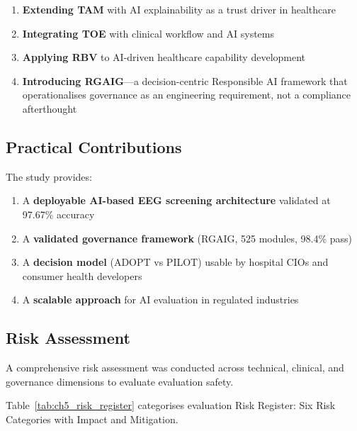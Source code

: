 \begin{enumerate}[label=(\alph*)]
    \item \textbf{Extending TAM} with AI explainability as a trust driver in healthcare
    \item \textbf{Integrating TOE} with clinical workflow and AI systems
    \item \textbf{Applying RBV} to AI-driven healthcare capability development
    \item \textbf{Introducing RGAIG}---a decision-centric Responsible AI framework that operationalises governance as an engineering requirement, not a compliance afterthought
\end{enumerate}

\subsection{Practical Contributions}

The study provides:

\begin{enumerate}[label=(\alph*)]
    \item A \textbf{deployable AI-based EEG screening architecture} validated at 97.67\% accuracy
    \item A \textbf{validated governance framework} (RGAIG, 525 modules, 98.4\% pass)
    \item A \textbf{decision model} (ADOPT vs PILOT) usable by hospital CIOs and consumer health developers
    \item A \textbf{scalable approach} for AI evaluation in regulated industries
\end{enumerate}


\subsection{Risk Assessment}

A comprehensive risk assessment was conducted across technical, clinical, and governance dimensions to evaluate evaluation safety.

\noindent Table~\ref{tab:ch5_risk_register} categorises evaluation Risk Register: Six Risk Categories with Impact and Mitigation.

